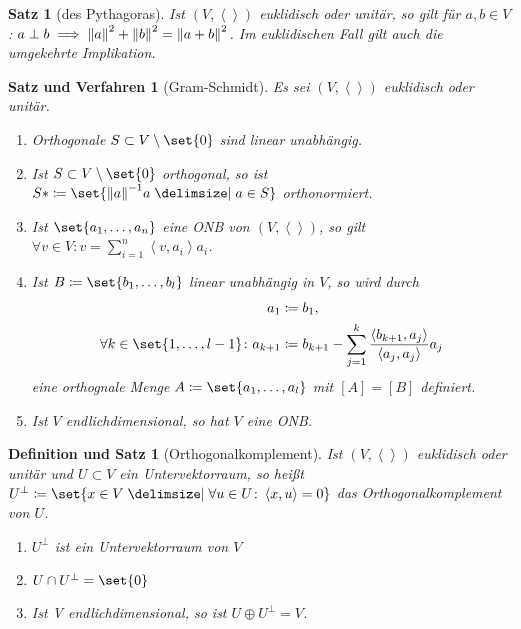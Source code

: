 \documentclass[a4paper]{article}
\theoremstyle{marginbreak}
\newtheorem{satz}[definition]{Satz}
\newtheorem{defsatz}[definition]{Definition und Satz}
\newtheorem{satzver}[definition]{Satz und Verfahren}
\newcommand\scp[1]{\left\langle#1\right\rangle}
\begin{document}
	\begin{satz}[des Pythagoras]
		Ist $(V, \scp{})$ euklidisch oder unitär, so gilt für $a, b\in V$: $a\perp b\implies \norm{a}^2 + \norm{b}^2 = \norm{a+b}^2$.
		Im euklidischen Fall gilt auch die umgekehrte Implikation.
	\end{satz}
	\begin{satzver}[Gram-Schmidt]
		Es sei $(V, \scp{})$ euklidisch oder unitär.
		\begin{enumerate}[label=(\alph*)]
			\item Orthogonale $S\subset V\setminus\set{0}$ sind linear unabhängig.
			\item Ist $S\subset V\setminus\set{0}$ orthogonal, so ist
				$S*\coloneqq\set{\norm{a}^{-1}a\given a\in S}$ orthonormiert.
			\item Ist $\set{a_1,\ldots,a_n}$ eine ONB von $(V,\scp{})$, so gilt
				$\forall v\in V\colon v = \sum_{i=1}^n\scp{v,a_i}a_i$.
			\item Ist $B\coloneqq \set{b_1,\ldots,b_l}$ linear unabhängig in $V$, so wird durch
				\begin{align*}
					a_1 &\coloneqq b_1,\\
					\forall k\in\set{1,\ldots,l - 1}\colon a_{k+1} &\coloneqq b_{k+1} - \sum_{j=1}^k\frac{\scp{b_{k+1}, a_j}}{\scp{a_j, a_j}}a_j
				\end{align*}
				eine orthognale Menge $A\coloneqq\set{a_1,\ldots,a_l}$ mit $[A] = [B]$ definiert.
			\item Ist $V$ endlichdimensional, so hat $V$ eine ONB.
		\end{enumerate}
	\end{satzver}
	\begin{defsatz}[Orthogonalkomplement]
		Ist $(V, \scp{})$ euklidisch oder unitär und $U\subset V$ ein Untervektorraum, so heißt
		$U^\perp \coloneqq\set{x\in V\given\forall u\in U\colon\scp{x, u}=0}$ das Orthogonalkomplement
		von $U$.
		\begin{enumerate}[label=(\alph*)]
			\item $U^\perp$ ist ein Untervektorraum von $V$
			\item $U\cap U^\perp=\set{0}$
			\item Ist V endlichdimensional, so ist $U\oplus U^\perp = V$.
		\end{enumerate}
	\end{defsatz}
\end{document}
